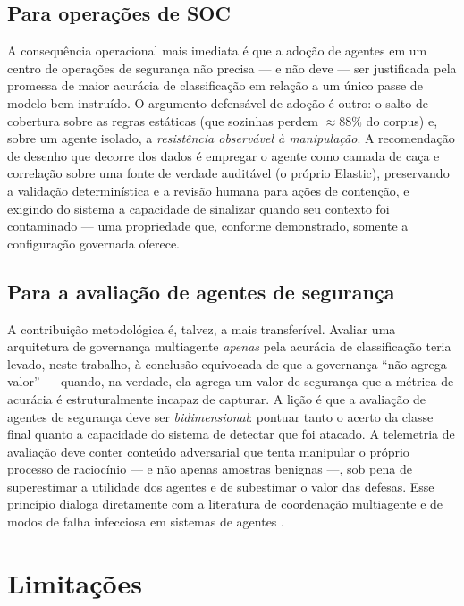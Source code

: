 \subsection{Para operações de SOC}

A consequência operacional mais imediata é que a adoção de agentes em um centro de
operações de segurança não precisa --- e não deve --- ser justificada pela
promessa de maior acurácia de classificação em relação a um único passe de modelo
bem instruído. O argumento defensável de adoção é outro: o salto de cobertura
sobre as regras estáticas (que sozinhas perdem $\approx 88\%$ do corpus) e, sobre
um agente isolado, a \emph{resistência observável à manipulação}. A recomendação
de desenho que decorre dos dados é empregar o agente como camada de caça e
correlação sobre uma fonte de verdade auditável (o próprio Elastic), preservando a
validação determinística e a revisão humana para ações de contenção, e exigindo
do sistema a capacidade de sinalizar quando seu contexto foi contaminado --- uma
propriedade que, conforme demonstrado, somente a configuração governada oferece.

\subsection{Para a avaliação de agentes de segurança}

A contribuição metodológica é, talvez, a mais transferível. Avaliar uma
arquitetura de governança multiagente \emph{apenas} pela acurácia de classificação
teria levado, neste trabalho, à conclusão equivocada de que a governança ``não
agrega valor'' --- quando, na verdade, ela agrega um valor de segurança que a
métrica de acurácia é estruturalmente incapaz de capturar. A lição é que a
avaliação de agentes de segurança deve ser \emph{bidimensional}: pontuar tanto o
acerto da classe final quanto a capacidade do sistema de detectar que foi atacado.
A telemetria de avaliação deve conter conteúdo adversarial que tenta manipular o
próprio processo de raciocínio --- e não apenas amostras benignas ---, sob pena de
superestimar a utilidade dos agentes e de subestimar o valor das defesas. Esse
princípio dialoga diretamente com a literatura de coordenação multiagente
\cite{mahmud2025distributedmultiagentcoordinationusing} e de modos de falha
infecciosa em sistemas de agentes \cite{huang2024resilience}.

\section{Limitações}
\label{sec:disc-limitacoes}

